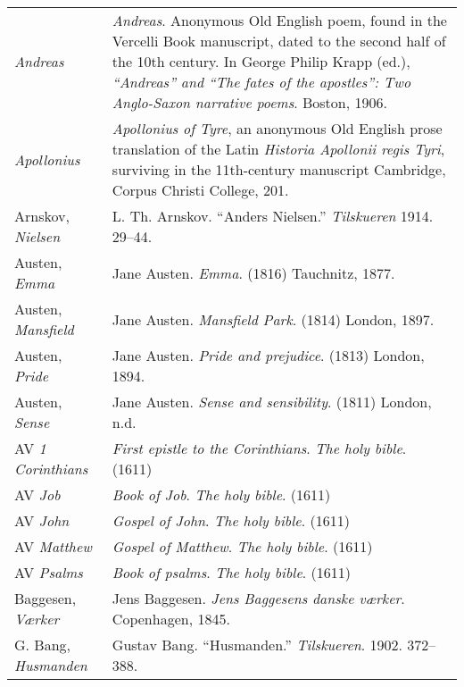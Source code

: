 \begin{longtable}{p{} p{}}
\textit{Andreas} & \textit{Andreas}. Anonymous Old English poem, found in the Vercelli Book manuscript, dated to the second half of the 10th century. In George Philip Krapp (ed.), \textit{``Andreas'' and ``The fates of the apostles'': Two Anglo-Saxon narrative poems}. Boston, 1906.\\  %

\textit{Apollonius} & \textit{Apollonius of Tyre}, an anonymous Old English prose translation of the Latin \textit{Historia Apollonii regis Tyri}, surviving in the 11th-century manuscript Cambridge, Corpus Christi College, 201.\\

Arnskov, \textit{Nielsen} & L. Th. Arnskov. ``Anders Nielsen.'' \textit{Tilskueren} 1914. 29--44. \\

Austen, \textit{Emma} & Jane Austen. \textit{Emma}. (1816) Tauchnitz, 1877. \\
Austen, \textit{Mansfield} & Jane Austen. \textit{Mansfield Park}. (1814) London, 1897. \\
Austen, \textit{Pride} & Jane Austen. \textit{Pride and prejudice}. (1813) London, 1894. \\
Austen, \textit{Sense} & Jane Austen. \textit{Sense and sensibility}. (1811) London, n.d. \\

AV \textit{1 Corinthians} & \textit{First epistle to the Corinthians}. \textit{The holy bible}. (1611) \\
AV \textit{Job} & \textit{Book of Job}. \textit{The holy bible}. (1611) \\
AV \textit{John} & \textit{Gospel of John}. \textit{The holy bible}. (1611) \\
AV \textit{Matthew} & \textit{Gospel of Matthew}. \textit{The holy bible}. (1611) \\
AV \textit{Psalms} & \textit{Book of psalms}. \textit{The holy bible}. (1611) \\

Baggesen, \textit{Værker} & Jens Baggesen. \textit{Jens Baggesens danske værker}. Copenhagen, 1845. \\

G. Bang, \textit{Husmanden} & Gustav Bang. ``Husmanden.'' \textit{Tilskueren}. 1902. 372--388. \\


\end{longtable}
